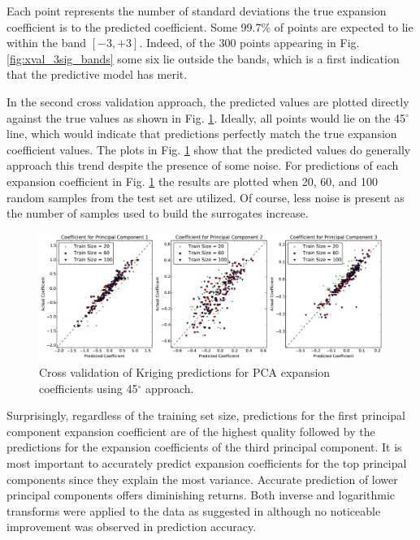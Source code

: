 Each point represents the number of standard deviations the true expansion coefficient is to the predicted coefficient. Some 99.7\% of points are expected to lie within the band $\left[-3, +3\right]$. Indeed, of the 300 points appearing in Fig. \ref{fig:xval_3sig_bands} some six lie outside the bands, which is a first indication that the predictive model has merit.  

In the second cross validation approach, the predicted values are plotted directly against the true values as shown in Fig. \ref{fig:xval_45degree}. Ideally, all points would lie on the 45$^{\circ}$ line, which would indicate that predictions perfectly match the true expansion coefficient values. The plots in Fig. \ref{fig:xval_45degree} show that the predicted values do generally approach this trend despite the presence of some noise. For predictions of each expansion coefficient in Fig. \ref{fig:xval_45degree} the results are plotted when 20, 60, and 100 random samples from the test set are utilized. Of course, less noise is present as the number of samples used to build the surrogates increase.  
\begin{figure}
\caption{\label{fig:xval_45degree}
Cross validation of Kriging predictions for \ac{PCA} expansion coefficients using 45$^\circ$ approach.}
 \begin{center}
  \includegraphics[scale=.4]{./Chapter4/xval_45degree.pdf}
 \end{center}
\end{figure}
Surprisingly, regardless of the training set size, predictions for the first principal component expansion coefficient are of the highest quality followed by the predictions for the expansion coefficients of the third principal component. It is most important to accurately predict expansion coefficients for the top principal components since they explain the most variance. Accurate prediction of lower principal components offers diminishing returns. Both inverse and logarithmic transforms were applied to the data as suggested in \cite{Jones_Schonlau} although no noticeable improvement was observed in prediction accuracy.   


